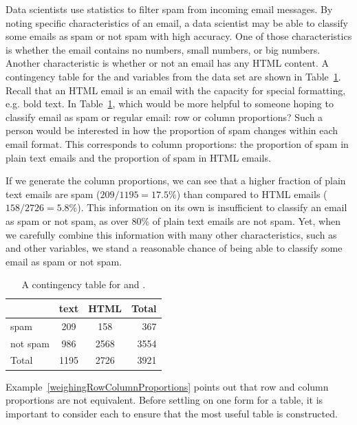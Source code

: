 \begin{example}{Data scientists use statistics to filter spam from incoming email messages. By noting specific characteristics of an email, a data scientist may be able to classify some emails as spam or not spam with high accuracy. One of those characteristics is whether the email contains no numbers, small numbers, or big numbers. Another characteristic is whether or not an email has any HTML content. A contingency table for the  and  variables from the  data set are shown in Table~\ref{emailSpamHTMLTableTotals}. Recall that an HTML email is an email with the capacity for special formatting, e.g. bold text. In Table~\ref{emailSpamHTMLTableTotals}, which would be more helpful to someone hoping to classify email as spam or regular email: row or column proportions?}\label{weighingRowColumnProportions}
Such a person would be interested in how the proportion of spam changes within each email format. This corresponds to column proportions: the proportion of spam in plain text emails and the proportion of spam in HTML emails.

If we generate the column proportions, we can see that a higher fraction of plain text emails are spam ($209/1195 = 17.5\%$) than compared to HTML emails ($158/2726 = 5.8\%$). This information on its own is insufficient to classify an email as spam or not spam, as over 80\% of plain text emails are not spam. Yet, when we carefully combine this information with many other characteristics, such as  and other variables, we stand a reasonable chance of being able to classify some email as spam or not spam.
\end{example}

\begin{table}[ht]
\centering
\begin{tabular}{l cc r}
  \hline
 & text & HTML & Total \\
  \hline
spam & 209 & 158 & 367 \\
not spam & 986 & 2568 & 3554 \\
   \hline
Total & 1195 & 2726 & 3921 \\
   \hline
\end{tabular}
\caption{A contingency table for  and .}
\label{emailSpamHTMLTableTotals}
\end{table}

Example~\ref{weighingRowColumnProportions} points out that row and column proportions are not equivalent. Before settling on one form for a table, it is important to consider each to ensure that the most useful table is constructed.

